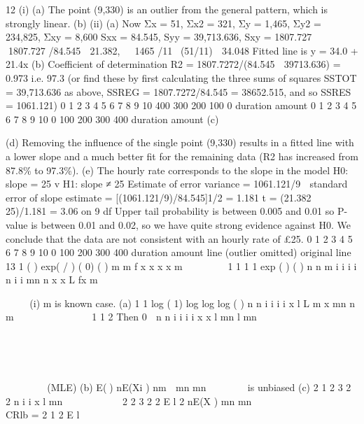 \documentclass[a4paper,12pt]{article}
\begin{document}
\begin{enumerate}
\begin{enumerate}
[Total 16]
\end{enumerate}
\newpage
12 (i) (a)
The point (9,330) is an outlier from the general pattern, which is
strongly linear.
(b)
(ii) (a) Now Σx = 51, Σx2 = 321, Σy = 1,465, Σy2 = 234,825, Σxy = 8,600
Sxx = 84.545, Syy = 39,713.636, Sxy = 1807.727
  1807.727 /84.545  21.382,  1465 /11(51/11)  34.048
Fitted line is y = 34.0 + 21.4x
(b) Coefficient of determination R2 = 1807.7272/(84.545  39713.636)
= 0.973 i.e. 97.3%
(or find these by first calculating the three sums of squares SSTOT
= 39,713.636 as above, SSREG = 1807.7272/84.545 = 38652.515, and
so SSRES = 1061.121)
0 1 2 3 4 5 6 7 8 9 10
400
300
200
100
0
duration
amount
0 1 2 3 4 5 6 7 8 9 10
0
100
200
300
400
duration
amount
(c)

(d) Removing the influence of the single point (9,330) results in a fitted
line with a lower slope and a much better fit for the remaining data (R2
has increased from 87.8\% to 97.3\%).
(e) The hourly rate corresponds to the slope in the model
H0: slope = 25 v H1: slope ≠ 25
Estimate of error variance = 1061.121/9
 standard error of slope estimate = [(1061.121/9)/84.545]1/2 = 1.181
t = (21.382  25)/1.181 = 	3.06 on 9 df
Upper tail probability is between 0.005 and 0.01 so P-value is between
0.01 and 0.02, so we have quite strong evidence against H0. We
conclude that the data are not consistent with an hourly rate of £25.
0 1 2 3 4 5 6 7 8 9 10
0
100
200
300
400
duration
amount
line (outlier omitted)
original line
13
1 ( ) exp( / ) ( 0)
( )
m
m
f x x x x
m
  
 
 
1 1
1
1
exp
( )
( )
n n m i i
i i n
i i mn n
x x
L fx
m
 


  
 
  	 
 

 


(i) m is known case.
(a) 1
1
log ( 1) log log log ( )
n
n i
i
i
i
x
l L m x mn n m 

      



1 1
2
Then 0 
n n
i i
i i
x x
l mn l
mn
   

  
 


   
 
(MLE)
(b) E() nE(Xi ) nm 
mn mn

    is unbiased
(c)
2
1
2 3 2 2
n
i
i
x
l mn  
  
  

2
2 3 2 2
E l 2 nE(X ) mn mn
  
       
 	  	 	 	
 CRlb =
2 1
2
E l
    
 		 


\end{enumerate}
\end{document}
